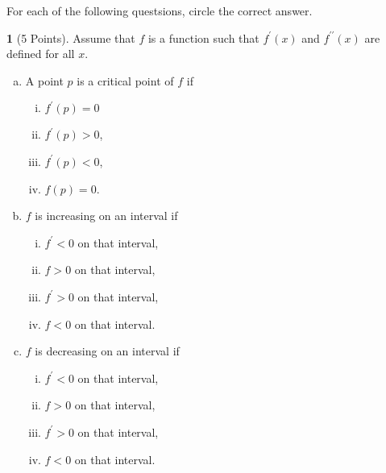 \documentclass[12pt]{amsart}
\theoremstyle{definition}
\newtheorem{thm}{}
\theoremstyle{definition}
\begin{document}
\newpage
For each of the following questsions, circle the correct answer.
\begin{thm}[5 Points]
  Assume that $f$ is a function such that $f^\prime(x)$ and $f^{\prime\prime}(x)$ are defined for all $x$.
  \begin{enumerate}[(a)]
  \item
    A point $p$ is a critical point of $f$ if
    \begin{multicols}{2}
      \begin{enumerate}[(i)]
      \item
        $f^\prime(p) = 0$
        \vspace{.05in}
      \item
        $f^\prime(p) > 0$,
      \item
        $f^\prime(p) < 0$,
        \vspace{.05in}
      \item
        $f(p) = 0$.
      \end{enumerate}
    \end{multicols}
  \item
    $f$ is increasing on an interval if
    \begin{multicols}{2}
      \begin{enumerate}[(i)]
      \item
        $f^\prime < 0$ on that interval,
        \vspace{.05in}
      \item
        $f > 0$ on that interval,
      \item
        $f^\prime > 0$ on that interval,
        \vspace{.05in}
      \item
        $f < 0$ on that interval.
      \end{enumerate}
    \end{multicols}
    \item
    $f$ is decreasing on an interval if
    \begin{multicols}{2}
      \begin{enumerate}[(i)]
      \item
        $f^\prime < 0$ on that interval,
        \vspace{.05in}
      \item
        $f > 0$ on that interval,
      \item
        $f^\prime > 0$ on that interval,
        \vspace{.05in}
      \item
        $f < 0$ on that interval.

\end{enumerate}
\end{multicols}
\end{enumerate}
\end{thm}
\end{document}
